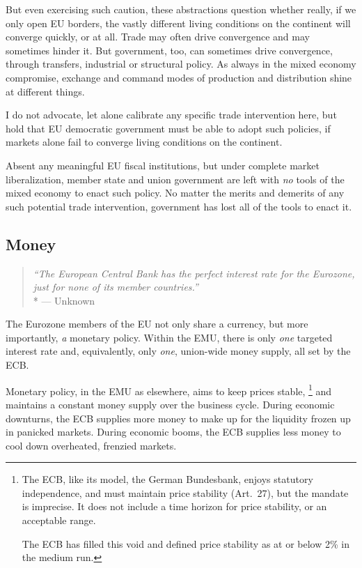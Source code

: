 But even exercising such caution, these abstractions question whether really, if we only open \gls{EU} borders, the vastly different living conditions on the continent will converge quickly, or at all.
Trade may often drive convergence and may sometimes hinder it.
But government, too, can sometimes drive convergence, through transfers, industrial or structural policy.
As always in the mixed economy compromise, exchange and command modes of production and distribution shine at different things.

I do not advocate, let alone calibrate any specific trade intervention here, but hold that \gls{EU} democratic government must be able to adopt such policies, if markets alone fail to converge living conditions on the continent.

Absent any meaningful \gls{EU} fiscal institutions, but under complete market liberalization, member state and union government are left with \emph{no} tools of the mixed economy to enact such policy.
No matter the merits and demerits of any such potential trade intervention, government has lost all of the tools to enact it.

\subsection{Money}

\begin{quote}
	\emph{``The European Central Bank has the perfect interest rate for the Eurozone, just for none of its member countries.''}
	\\*
	--- Unknown
\end{quote}

The Eurozone members of the \gls{EU} not only share a currency, but more importantly, \emph{a} monetary policy.
Within the \gls{EMU}, there is only \emph{one} targeted interest rate and, equivalently, only \emph{one}, union-wide money supply, all set by the \gls{ECB}.

Monetary policy, in the \gls{EMU} as elsewhere, aims to keep prices stable,
\footnote{
	The \gls{ECB}, like its model, the German Bundesbank, enjoys statutory independence, and must maintain price stability (Art.~27), but the mandate is imprecise.
	It does not include a time horizon for price stability, or an acceptable range.

	The \gls{ECB} has filled this void and defined price stability as at or below 2\% in the medium run.
}
and maintains a constant money supply over the business cycle.
During economic downturns, the \gls{ECB} supplies more money to make up for the liquidity frozen up in panicked markets.
During economic booms, the \gls{ECB} supplies less money to cool down overheated, frenzied markets.

